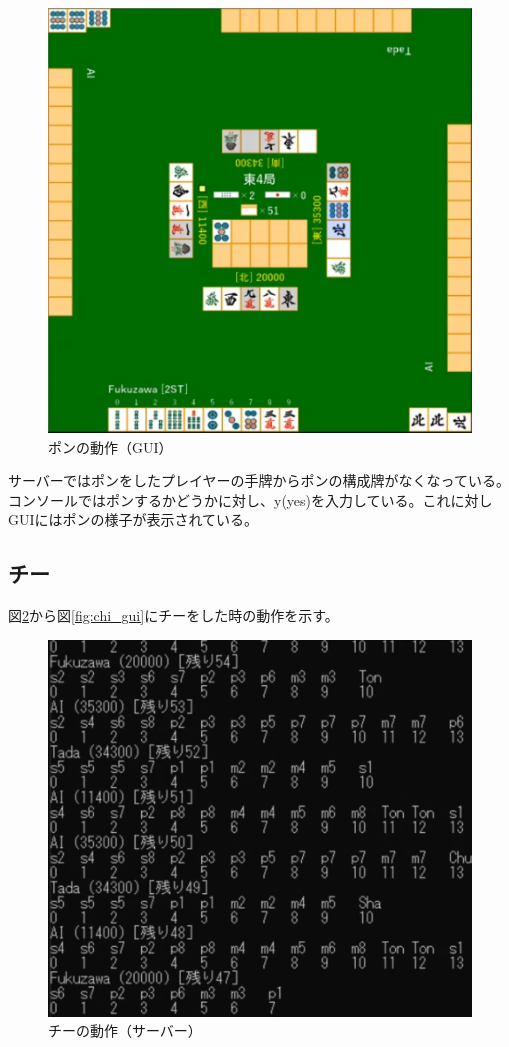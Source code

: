 \documentclass[a4j,titlepage]{jsarticle}
\begin{document}
\begin{figure}[H]
  \centering
  \includegraphics[scale = 0.8]{images/pon_gui.png}
  \caption{ポンの動作（GUI）}
  \label{fig:pon_gui}
\end{figure}

サーバーではポンをしたプレイヤーの手牌からポンの構成牌がなくなっている。コンソールではポンするかどうかに対し、y(yes)を入力している。これに対しGUIにはポンの様子が表示されている。

\subsection{チー}
図\ref{fig:chi_server}から図\ref{fig:chi_gui}にチーをした時の動作を示す。

\begin{figure}[H]
  \centering
  \includegraphics[scale = 0.8]{images/chi_server.png}
  \caption{チーの動作（サーバー）}
  \label{fig:chi_server}
\end{figure}
\end{document}
